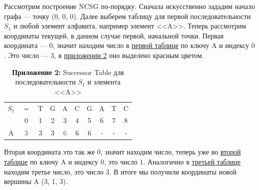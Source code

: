 \documentclass[a4paper,12pt]{extarticle}
\begin{document}
Рассмотрим построение NCSG по-порядку. Сначала искусственно зададим начало графа — точку (0, 0, 0). Далее выберем таблицу для первой последовательности $S_{1}$ и любой элемент алфавита, например элемент <<A>>. Теперь рассмотрим координаты текущей, в данном случае первой, начальной точки. Первая координата — $0$, значит находим число в \hyperref[table:2]{первой таблице} по ключу A и индексу $0$. Это число — $3$, в \hyperref[table:2]{приложении 2} оно выделено красным цветом.
\begin{table}[h!]
  \centering
  \caption*{\textbf{Приложение 2: }Successor Table для последовательности $S_{1}$ и элемента <<A>>}
  \label{table:2}
  \renewcommand{\arraystretch}{1.5}
  \renewcommand{\tabcolsep}{0.25cm}
  \begin{tabular}{ c | c | c | c | c | c | c | c | c | c |}
    $S_{1}$ & $=$ & T & G & A & C & G & A & T & C \\
            & 0 & 1 & 2 & 3 & 4 & 5 & 6 & 7 & 8 \\
    \hline
    A & \textcolor{red}{3} & 3 & 3 & \textcolor{teal}{6} & 6 & 6 & - & - & - \\
    \hline
  \end{tabular}
\end{table}

\noindent Вторая координата это так же $0$, значит находим число, теперь уже во \hyperref[table:3]{второй таблице} по ключу A и индексу $0$, это число $1$. Аналогично в \hyperref[table:4]{третьей таблице} находим третье число, это число $3$. В итоге мы получили координаты новой вершины A (3, 1, 3).
\end{document}

